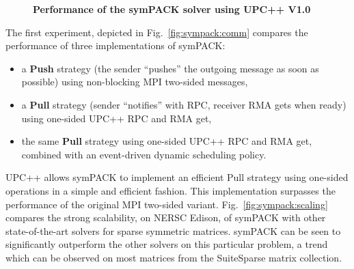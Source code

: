 \begin{figure}[htb]
	\centering
  \caption{\label{fig:sympack-perf}\textbf{Performance of the symPACK solver using UPC++ V1.0} }
\end{figure}



The first experiment, depicted in Fig.~\ref{fig:sympack:comm} compares the performance of three implementations of symPACK:
\begin{itemize}
  \item a \textbf{Push} strategy (the sender ``pushes'' the outgoing message
as soon as possible) using non-blocking MPI two-sided messages,
  \item a \textbf{Pull} strategy (sender ``notifies'' with RPC, receiver RMA gets when ready) using one-sided UPC++ RPC and RMA get,
  \item the same \textbf{Pull} strategy using one-sided UPC++ RPC and RMA get, combined with an event-driven dynamic scheduling policy.
\end{itemize}
UPC++ allows symPACK to implement an efficient Pull strategy using one-sided operations in a simple and efficient fashion.
This implementation surpasses the performance of the original MPI two-sided variant.
Fig.~\ref{fig:sympack:scaling} compares the strong scalability, on NERSC Edison, of symPACK with other state-of-the-art solvers
for sparse symmetric matrices. symPACK can be seen to significantly outperform
the other solvers on this particular problem, a trend which can be observed on most matrices from the SuiteSparse
matrix collection.

